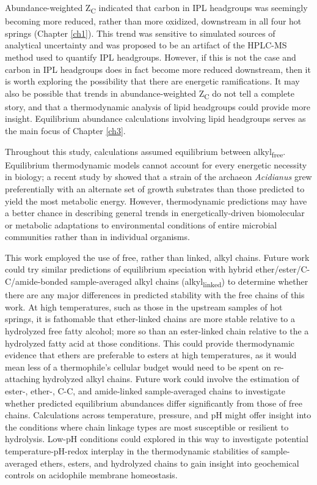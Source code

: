 Abundance-weighted Z\textsubscript{C} indicated that carbon in IPL headgroups was seemingly becoming more reduced, rather than more oxidized, downstream in all four hot springs (Chapter \ref{ch1}). This trend was sensitive to simulated sources of analytical uncertainty and was proposed to be an artifact of the HPLC-MS method used to quantify IPL headgroups. However, if this is not the case and carbon in IPL headgroups does in fact become more reduced downstream, then it is worth exploring the possibility that there are energetic ramifications. It may also be possible that trends in abundance-weighted Z\textsubscript{C} do not tell a complete story, and that a thermodynamic analysis of lipid headgroups could provide more insight. Equilibrium abundance calculations involving lipid headgroups serves as the main focus of Chapter \ref{ch3}.

Throughout this study, calculations assumed equilibrium between alkyl\textsubscript{free}. Equilibrium thermodynamic models cannot account for every energetic necessity in biology; a recent study by \cite{amenabar2017microbial} showed that a strain of the archaeon \textit{Acidianus} grew preferentially with an alternate set of growth substrates than those predicted to yield the most metabolic energy. However, thermodynamic predictions may have a better chance in describing general trends in energetically-driven biomolecular or metabolic adaptations to environmental conditions of entire microbial communities rather than in individual organisms.

This work employed the use of free, rather than linked, alkyl chains. Future work could try similar predictions of equilibrium speciation with hybrid ether/ester/C-C/amide-bonded sample-averaged alkyl chains (alkyl\textsubscript{linked}) to determine whether there are any major differences in predicted stability with the free chains of this work. At high temperatures, such as those in the upstream samples of hot springs, it is fathomable that ether-linked chains are more stable relative to a hydrolyzed free fatty alcohol; more so than an ester-linked chain relative to the a hydrolyzed fatty acid at those conditions. This could provide thermodynamic evidence that ethers are preferable to esters at high temperatures, as it would mean less of a thermophile's cellular budget would need to be spent on re-attaching hydrolyzed alkyl chains. Future work could involve the estimation of ester-, ether-, C-C, and amide-linked sample-averaged chains to investigate whether predicted equilibrium abundances differ significantly from those of free chains. Calculations across temperature, pressure, and pH might offer insight into the conditions where chain linkage types are most susceptible or resilient to hydrolysis. Low-pH conditions could explored in this way to investigate potential temperature-pH-redox interplay in the thermodynamic stabilities of sample-averaged ethers, esters, and hydrolyzed chains to gain insight into geochemical controls on acidophile membrane homeostasis.




